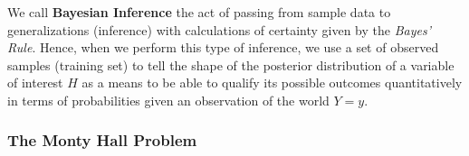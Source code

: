 \documentclass{article}
\begin{document}
\begin{info} %
	We call \textbf{Bayesian Inference} the act of passing from sample data to generalizations (inference) with calculations of certainty given by the \textit{Bayes' Rule}. Hence, when we perform this type of inference, we use a set of observed samples (training set) to tell the shape of the posterior distribution of a variable of interest $H$ as a means to be able to qualify its possible outcomes quantitatively in terms of probabilities given an observation of the world $Y = y$.
\end{info}





\subsubsection{The Monty Hall Problem}
\end{document}
